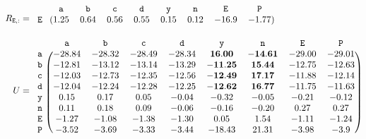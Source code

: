 \documentclass{article}
\newcommand{\ta}{\mathtt{a}}
\newcommand{\tb}{\mathtt{b}}
\newcommand{\tc}{\mathtt{c}}
\newcommand{\td}{\mathtt{d}}
\newcommand{\tn}{\mathtt{n}}
\newcommand{\ty}{\mathtt{y}}
\newcommand{\tE}{\mathtt{E}}
\newcommand{\tP}{\mathtt{P}}
\begin{document}
\begin{displaymath}
  \begin{aligned}
  R_{\tE,:} &=
  \begin{blockarray}{ccccccccc}
       & \ta & \tb & \tc & \td & \ty & \tn & \tE & \tP  \\
      \begin{block}{r(cccccccc)}
        \tE & 1.25 &  0.64 &  0.56 &  0.55 &  0.15 &  0.12 &  -16.9 & -1.77 \\
      \end{block}
    \end{blockarray} \\
    U &=
  \begin{blockarray}{ccccccccc}
       & \ta & \tb & \tc & \td & \ty & \tn & \tE & \tP  \\
      \begin{block}{r(cccccccc)}
        \ta & -28.84 & -28.32 & -28.49 & -28.34 & \mathbf{16.00} & \mathbf{-14.61} & -29.00 & -29.01 \\
        \tb & -12.81 & -13.12 & -13.14 & -13.29 & \mathbf{-11.25} & \mathbf{15.44} & -12.75 & -12.63 \\
        \tc & -12.03 & -12.73 & -12.35 & -12.56 & \mathbf{-12.49} & \mathbf{17.17} & -11.88 & -12.14 \\
        \td & -12.04 & -12.24 & -12.28 & -12.25 & \mathbf{-12.62} & \mathbf{16.77} & -11.75 & -11.63 \\
        \ty & 0.15 & 0.17 & 0.05 & -0.04 & -0.32 & -0.05 & -0.21 & -0.12 \\
        \tn & 0.11 & 0.18 & 0.09 & -0.06 & -0.16 & -0.20 & 0.27 & 0.27 \\
        \tE & -1.27 & -1.08 & -1.38 & -1.30 & 0.05 & 1.54 & -1.11 & -1.24 \\
        \tP & -3.52 & -3.69 & -3.33 & -3.44 & -18.43 & 21.31 & -3.98 & -3.9 \\
      \end{block}
    \end{blockarray} \\    
  \end{aligned}
\end{displaymath}
\end{document}
